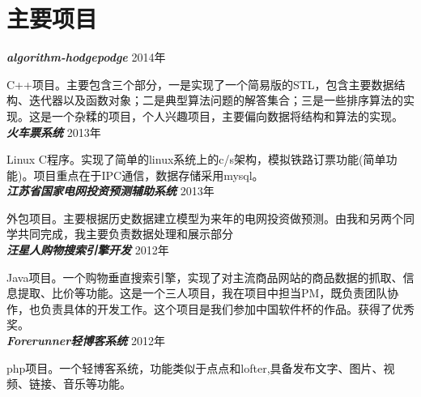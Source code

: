 \documentclass[10pt]{article} %
\begin{document}
\begin{minipage}[t]{0.6\textwidth}

\section{主要项目}

{\bf \large \textit{algorithm-hodgepodge}} \hfill  \hfill {2014年\\}

\normalsize{C++项目。主要包含三个部分，一是实现了一个简易版的STL，包含主要数据结构、迭代器以及函数对象；二是典型算法问题的解答集合；三是一些排序算法的实现。这是一个杂糅的项目，个人兴趣项目，主要偏向数据将结构和算法的实现。}\\

{\bf \large \textit{火车票系统}} \hfill  \hfill {2013年\\}

\normalsize{Linux C程序。实现了简单的linux系统上的c/s架构，模拟铁路订票功能(简单功能)。项目重点在于IPC通信，数据存储采用mysql。}\\


{\bf \large \textit{江苏省国家电网投资预测辅助系统}} \hfill  \hfill {2013年\\}

\normalsize{外包项目。主要根据历史数据建立模型为来年的电网投资做预测。由我和另两个同学共同完成，我主要负责数据处理和展示部分}\\

{\bf \large \textit{汪星人购物搜索引擎开发}} \hfill  \hfill {2012年\\}

\normalsize{Java项目。一个购物垂直搜索引擎，实现了对主流商品网站的商品数据的抓取、信息提取、比价等功能。这是一个三人项目，我在项目中担当PM，既负责团队协作，也负责具体的开发工作。这个项目是我们参加中国软件杯的作品。获得了优秀奖。}\\

{\bf \large \textit{Forerunner轻博客系统}} \hfill  \hfill {2012年\\}

\normalsize{php项目。一个轻博客系统，功能类似于点点和lofter,具备发布文字、图片、视频、链接、音乐等功能。}\\


\end{minipage} %
\end{document}
